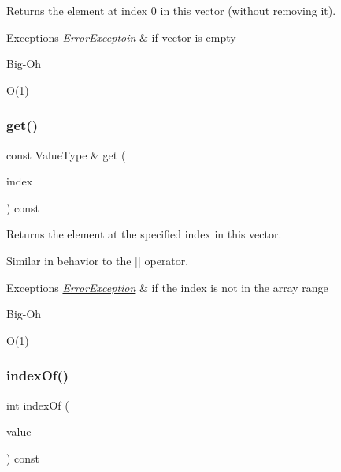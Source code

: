 Returns the element at index 0 in this vector (without removing it). 


\begin{DoxyExceptions}{Exceptions}
{\em Error\+Exceptoin} & if vector is empty \\
\hline
\end{DoxyExceptions}
\begin{DoxyRefDesc}{Big-\/\+Oh}
\item[\mbox{\hyperlink{BigOh__BigOh000114}{Big-\/\+Oh}}]O(1) \end{DoxyRefDesc}
\mbox{\label{classVector_adcb38df411d14f0bd9c14e23947d2e1c}} 
\subsubsection{\texorpdfstring{get()}{get()}}
{\footnotesize\ttfamily const Value\+Type \& get (\begin{DoxyParamCaption}\item[{int}]{index }\end{DoxyParamCaption}) const}



Returns the element at the specified index in this vector. 

Similar in behavior to the \mbox{[}\mbox{]} operator. 
\begin{DoxyExceptions}{Exceptions}
{\em \mbox{\hyperlink{classErrorException}{Error\+Exception}}} & if the index is not in the array range \\
\hline
\end{DoxyExceptions}
\begin{DoxyRefDesc}{Big-\/\+Oh}
\item[\mbox{\hyperlink{BigOh__BigOh000115}{Big-\/\+Oh}}]O(1) \end{DoxyRefDesc}
\mbox{\label{classVector_a619aacfb96804495d3182a7131cf3539}} 
\subsubsection{\texorpdfstring{index\+Of()}{indexOf()}}
{\footnotesize\ttfamily int index\+Of (\begin{DoxyParamCaption}\item[{const Value\+Type \&}]{value }\end{DoxyParamCaption}) const}




